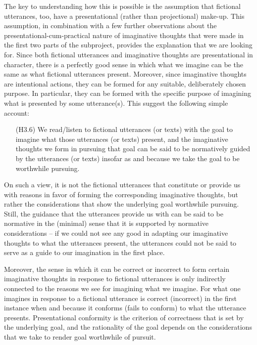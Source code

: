 \noindent The key to understanding how this is possible is the assumption that fictional utterances, too, have a presentational (rather than projectional) make-up. This assumption, in combination with a few further observations about the presentational-cum-practical nature of imaginative thoughts that were made in the first two parts of the subproject, provides the explanation that we are looking for. Since both fictional utterances and imaginative thoughts are presentational in character, there is a perfectly good sense in which what we imagine can be the same as what fictional utterances present. Moreover, since imaginative thoughts are intentional actions, they can be formed for any suitable, deliberately chosen purpose. In particular, they can be formed with the specific purpose of imagining what is presented by some utterance(s). This suggest the following simple account:

\vspace{-.1cm}
\begin{itemize}[leftmargin=2cm]
\item[(H3.6)] We read/listen to fictional utterances (or texts) with the goal to imagine what those utterances (or texts) present, and the imaginative thoughts we form in pursuing that goal can be said to be normatively guided by the utterances (or texts) insofar as and because we take the goal to be worthwhile pursuing.
\end{itemize}
\vspace{-.1cm}

\noindent On such a view, it is not the fictional utterances that constitute or provide us with reasons in favor of forming the corresponding imaginative thoughts, but rather the considerations that show the underlying goal worthwhile pursuing. Still, the guidance that the utterances provide us with can be said to be normative in the (minimal) sense that it is supported by normative considerations -- if we could not see any good in adapting our imaginative thoughts to what the utterances present, the utterances could not be said to serve as a guide to our imagination in the first place.

Moreover, the sense in which it can be correct or incorrect to form certain imaginative thoughts in response to fictional utterances is only indirectly connected to the reasons we see for imagining what we imagine. For what one imagines in response to a fictional utterance is correct (incorrect) in the first instance when and because it conforms (fails to conform) to what the utterance presents. Presentational conformity is the criterion of correctness that is set by the underlying goal, and the rationality of the goal depends on the considerations that we take to render goal worthwhile of pursuit.

